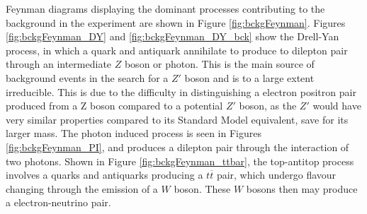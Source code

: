 \documentclass{article}
\begin{document}
Feynman diagrams displaying the dominant processes contributing to the background in the experiment are shown in Figure \ref{fig:bckgFeynman}. Figures \ref{fig:bckgFeynman_DY} and \ref{fig:bckgFeynman_DY_bck} show the Drell-Yan process, in which a quark and antiquark annihilate to produce to dilepton pair through an intermediate $Z$ boson or photon. This is the main source of background events in the search for a $Z'$ boson and is to a large extent irreducible. This is due to the difficulty in distinguishing a electron positron pair produced from a Z boson compared to a potential $Z'$ boson, as the $Z'$ would have very similar properties compared to its Standard Model equivalent, save for its larger mass. The photon induced process is seen in Figures \ref{fig:bckgFeynman_PI}, and produces a dilepton pair through the interaction of two photons. Shown in Figure \ref{fig:bckgFeynman_ttbar}, the top-antitop process involves a quarks and antiquarks producing a $t\overline{t}$ pair, which undergo flavour changing through the emission of a $W$ boson. These $W$ bosons then may produce a electron-neutrino pair.
\end{document}
